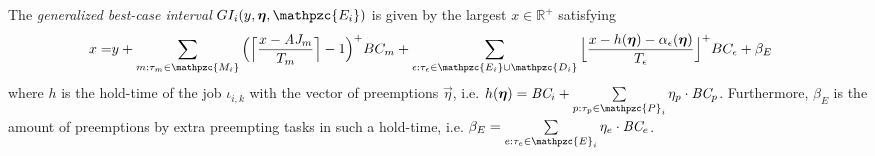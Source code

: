 \begin{theorem}
	The \textit{generalized best-case interval} $GI_i(y, \vec{\eta},  \mathpzc{E_i})$ is given by the largest $x \in \mathbb{R}^+$ satisfying
	\begin{align} \label{eq:g_best_interval}
	\begin{split}
	x = &y + \sum\limits_{m:\tau_m \in \mathpzc{M_i}} \Big( \Big\lceil  \dfrac{x-\aj_m}{T_m}\Big\rceil -1 \Big)^+  BC_m + \sum\limits_{\epsilon:\tau_{\epsilon} \in \mathpzc{E_i} \cup \mathpzc{D_i}} \Big\lfloor  \dfrac{x-h(\vec{\eta})-\alpha_\epsilon(\vec{\eta})}{T_\epsilon}\Big\rfloor^+  BC_\epsilon+ \beta_E
	\end{split} 
		\end{align}
	where $h$ is the hold-time of the job $\iota_{i,k}$ with the vector of preemptions $\vec{\eta}$, i.e. $h(\vec{\eta})=\bc_i + \sum\limits_{p:\tau_p \in \mathpzc{P}_i} \eta_p \cdot \bc_p$. Furthermore,  $\beta_E$ is the amount of preemptions by extra preempting tasks in such a hold-time, i.e. $\beta_E = \sum\limits_{e:\tau_e \in \mathpzc{E}_i} \eta_e \cdot \bc_e$.
\end{theorem}

